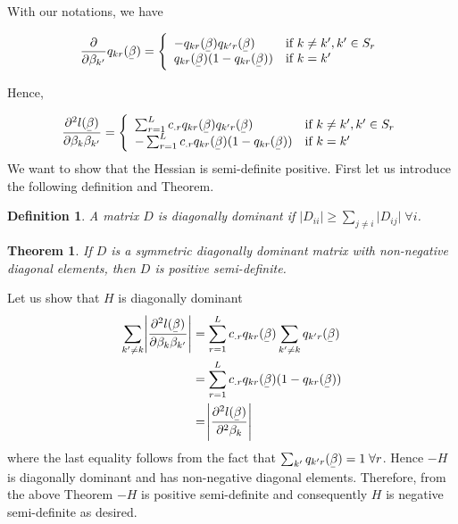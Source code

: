 \documentclass[11pt]{article}
\newcommand{\ubar}[1]{\underaccent{\bar}{#1}}
\newtheorem{theorem}{Theorem}
\newtheorem{definition}{Definition}
\begin{document}
With our notations, we have 

$$ \frac{\partial }{\partial \beta_{k'}}   q_{kr} ( \ubar \beta)
= \left\{
    \begin{array}{ll}
      -q_{kr} ( \ubar \beta)     q_{k'r} ( \ubar \beta)                     & \mbox{if } k \neq k' , k' \in S_r \\
       q_{kr} ( \ubar \beta) ( 1-q_{kr} ( \ubar \beta)       )   & \mbox{if } k=k'
    \end{array}
\right.
$$

Hence,

$$\frac{\partial^2 l(\ubar \beta)}{\partial \beta_k \beta_{k'}} 
= \left\{
    \begin{array}{ll}
        \sum_{r=1}^L c_{.r} q_{kr} ( \ubar \beta)     q_{k'r} ( \ubar \beta)                     & \mbox{if } k \neq k' , k' \in S_r \\
       -  \sum_{r=1}^L c_{.r}q_{kr} ( \ubar \beta) ( 1-q_{kr} ( \ubar \beta)   )       & \mbox{if } k=k'
    \end{array}
\right.
$$
We want to show that the Hessian is semi-definite positive. First let us introduce the following definition and Theorem.

\begin{definition}
A matrix $D$ is diagonally dominant if $ \vert D_{ii} \vert  \geq \sum_{j \neq i} \vert D_{ij} \vert \;  \forall i$.
\end{definition}

\begin{theorem}
If $D$ is a symmetric diagonally dominant matrix with non-negative diagonal elements, then $D$ is positive semi-definite.
\end{theorem}

Let us show that $H$ is diagonally dominant
\begin{align*}
 \sum_{k' \neq k} \abs{ \frac{\partial^2 l(\ubar \beta)}{\partial \beta_k \beta_{k'}} } &=  \sum_{r=1}^L c_{.r} q_{kr} ( \ubar \beta)     \sum_{k' \neq k} q_{k'r} ( \ubar \beta)   \\
 &=  \sum_{r=1}^L c_{.r} q_{kr} ( \ubar \beta)     (1- q_{kr} ( \ubar \beta) )   \\
 &= \abs{\frac{\partial^2 l(\ubar \beta)}{\partial ^2\beta_k }}
\end{align*}
where the last equality follows from the fact that $\sum_{k'} q_{k'r} ( \ubar \beta ) =1 \; \forall r$. Hence $-H$ is diagonally dominant and has non-negative diagonal elements. Therefore, from the above Theorem $-H$ is positive semi-definite and consequently $H$ is negative semi-definite as desired.
\end{document}
